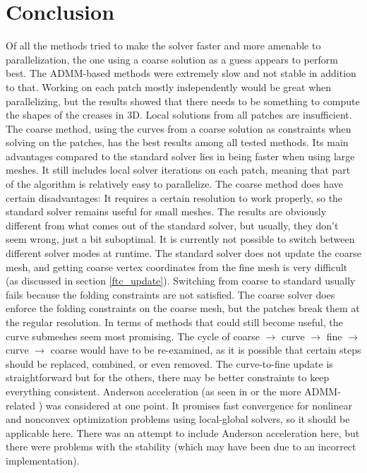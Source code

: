 \documentclass[a4paper,twoside,12pt,nochapterprefix]{scrbook}
\begin{document}
\chapter{Conclusion}\label{sec:conclusion}
Of all the methods tried to make the solver faster and more amenable to parallelization, the one using a coarse solution as a guess appears to perform best.\newline
The ADMM-based methods were extremely slow and not stable in addition to that. Working on each patch mostly independently would be great when parallelizing, but the results showed that there needs to be something to compute the shapes of the creases in 3D. Local solutions from all patches are insufficient.\newline
The coarse method, using the curves from a coarse solution as constraints when solving on the patches, has the best results among all tested methods. Its main advantages compared to the standard solver lies in being faster when using large meshes. It still includes local solver iterations on each patch, meaning that part of the algorithm is relatively easy to parallelize.\newline
The coarse method does have certain disadvantages: It requires a certain resolution to work properly, so the standard solver remains useful for small meshes. The results are obviously different from what comes out of the standard solver, but usually, they don't seem wrong, just a bit suboptimal.\newline
It is currently not possible to switch between different solver modes at runtime. The standard solver does not update the coarse mesh, and getting coarse vertex coordinates from the fine mesh is very difficult (as discussed in section \ref{ftc_update}). Switching from coarse to standard usually fails because the folding constraints are not satisfied. The coarse solver does enforce the folding constraints on the coarse mesh, but the patches break them at the regular resolution.\newline
In terms of methods that could still become useful, the curve submeshes seem most promising. The cycle of coarse $\rightarrow$ curve $\rightarrow$ fine $\rightarrow$ curve $\rightarrow$ coarse would have to be re-examined, as it is possible that certain steps should be replaced, combined, or even removed. The curve-to-fine update is straightforward but for the others, there may be better constraints to keep everything consistent.\newline
Anderson acceleration (as seen in \cite{Peng_2018} or the more ADMM-related \cite{Zhang_2019}) was considered at one point. It promises fast convergence for nonlinear and nonconvex optimization problems using local-global solvers, so it should be applicable here. There was an attempt to include Anderson acceleration here, but there were problems with the stability (which may have been due to an incorrect implementation).\newline
\end{document}
